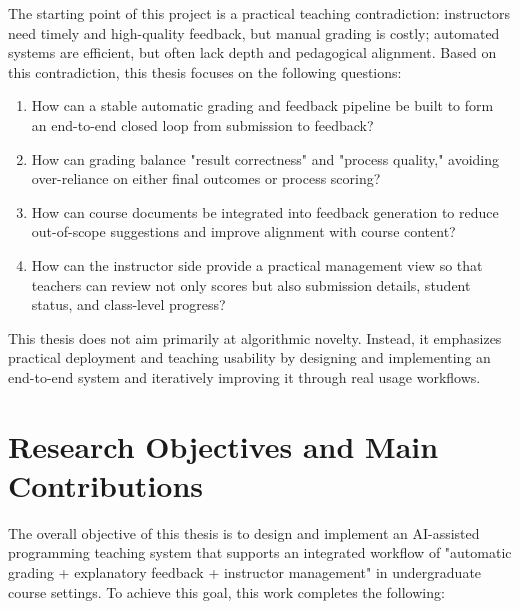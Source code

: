 The starting point of this project is a practical teaching contradiction: instructors need timely and high-quality feedback, but manual grading is costly; automated systems are efficient, but often lack depth and pedagogical alignment. Based on this contradiction, this thesis focuses on the following questions:

\begin{enumerate}
\item How can a stable automatic grading and feedback pipeline be built to form an end-to-end closed loop from submission to feedback?
\item How can grading balance "result correctness" and "process quality," avoiding over-reliance on either final outcomes or process scoring?
\item How can course documents be integrated into feedback generation to reduce out-of-scope suggestions and improve alignment with course content?
\item How can the instructor side provide a practical management view so that teachers can review not only scores but also submission details, student status, and class-level progress?
\end{enumerate}


This thesis does not aim primarily at algorithmic novelty. Instead, it emphasizes practical deployment and teaching usability by designing and implementing an end-to-end system and iteratively improving it through real usage workflows.

\section{Research Objectives and Main Contributions}

The overall objective of this thesis is to design and implement an AI-assisted programming teaching system that supports an integrated workflow of "automatic grading + explanatory feedback + instructor management" in undergraduate course settings. To achieve this goal, this work completes the following:

